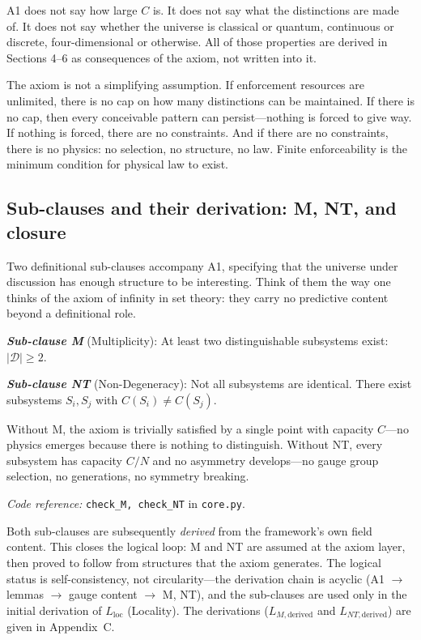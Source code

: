 \documentclass[11pt]{article}
\newcommand{\coderef}[2]{\smallskip\noindent\textit{Code reference:} \texttt{#1} in \texttt{#2}.}
\begin{document}
A1 does not say how large $C$ is.  It does not say what the distinctions are made of.  It does not say whether the universe is classical or quantum, continuous or discrete, four-dimensional or otherwise.  All of those properties are derived in Sections 4--6 as consequences of the axiom, not written into it.

The axiom is not a simplifying assumption.  If enforcement resources are unlimited, there is no cap on how many distinctions can be maintained.  If there is no cap, then every conceivable pattern can persist---nothing is forced to give way.  If nothing is forced, there are no constraints.  And if there are no constraints, there is no physics: no selection, no structure, no law.  Finite enforceability is the minimum condition for physical law to exist.

\subsection{Sub-clauses and their derivation: M, NT, and closure}

Two definitional sub-clauses accompany A1, specifying that the universe under discussion has enough structure to be interesting.  Think of them the way one thinks of the axiom of infinity in set theory: they carry no predictive content beyond a definitional role.

\begin{tcolorbox}[apfbox, title={Sub-Clauses M (Multiplicity) and NT (Non-Degeneracy)}]
\textbf{\textit{Sub-clause M}} (Multiplicity): At least two distinguishable subsystems exist: $|\mathcal{D}| \ge 2$.

\smallskip
\textbf{\textit{Sub-clause NT}} (Non-Degeneracy): Not all subsystems are identical.  There exist subsystems $S_i, S_j$ with $C(S_i) \ne C(S_j)$.

\smallskip
Without M, the axiom is trivially satisfied by a single point with capacity $C$---no physics emerges because there is nothing to distinguish.  Without NT, every subsystem has capacity $C/N$ and no asymmetry develops---no gauge group selection, no generations, no symmetry breaking.

\coderef{check\_M, check\_NT}{core.py}
\end{tcolorbox}

Both sub-clauses are subsequently \emph{derived} from the framework's own field content.  This closes the logical loop: M and NT are assumed at the axiom layer, then proved to follow from structures that the axiom generates.  The logical status is self-consistency, not circularity---the derivation chain is acyclic (A1 $\to$ lemmas $\to$ gauge content $\to$ M, NT), and the sub-clauses are used only in the initial derivation of $L_{\mathrm{loc}}$ (Locality).  The derivations ($L_{M,\mathrm{derived}}$ and $L_{NT,\mathrm{derived}}$) are given in Appendix~C.
\end{document}
